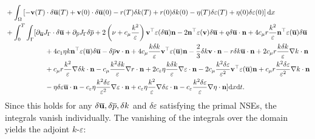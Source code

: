 \documentclass[oneside,11pt]{book}
\numberwithin{equation}{section}
\begin{document}
\begin{align*}
    &+ \int_\Omega \left[-{\bf v}(T)\cdot\delta\overline{\bf u}(T) + {\bf v}(0)\cdot\delta\overline{\bf u}(0) - r(T)\delta k(T) + r(0)\delta k(0) - \eta(T)\delta\varepsilon(T) + \eta(0)\delta\varepsilon(0)\right]{\rm d}x\\
    &+ \int_0^T\int_\Gamma [\partial_{\overline{\bf u}}J_\Gamma\cdot\delta\overline{\bf u} + \partial_{\overline{p}}J_\Gamma\delta\overline{p} + 2\left(\nu + c_\mu\frac{k^2}{\varepsilon}\right){\bf v}^\top\varepsilon(\delta\overline{\bf u}){\bf n} - 2{\bf n}^\top\varepsilon({\bf v})\delta\overline{\bf u} + q\delta\overline{\bf u}\cdot{\bf n} + 4c_\mu r\frac{k^2}{\varepsilon}{\bf n}^\top\varepsilon(\overline{\bf u})\delta\overline{\bf u}\\
    &\hspace{2cm} + 4c_1\eta k{\bf n}^\top\varepsilon(\overline{\bf u})\delta\overline{\bf u} - \delta\overline{p}{\bf v}\cdot{\bf n} + 4c_\mu\frac{k\delta k}{\varepsilon}{\bf v}^\top\varepsilon(\overline{\bf u}){\bf n} - \frac{2}{3}\delta k{\bf v}\cdot{\bf n} - r\delta k\overline{\bf u}\cdot{\bf n} + 2c_\mu r\frac{k\delta k}{\varepsilon}\nabla k\cdot{\bf n}\\
    &\hspace{2cm} + c_\mu r\frac{k^2}{\varepsilon}\nabla\delta k\cdot{\bf n} - c_\mu\frac{k^2\delta k}{\varepsilon}\nabla r\cdot{\bf n} + 2c_\varepsilon\eta\frac{k\delta k}{\varepsilon}\nabla\varepsilon\cdot{\bf n} - 2c_\mu\frac{k^2\delta\varepsilon}{\varepsilon^2}{\bf v}^\top\varepsilon(\overline{\bf u}){\bf n} + c_\mu r\frac{k^2\delta\varepsilon}{\varepsilon^2}\nabla k\cdot{\bf n}\\
    &\hspace{2cm} - \eta\delta\varepsilon\overline{\bf u}\cdot{\bf n} - c_\varepsilon\eta\frac{k^2\delta \varepsilon}{\varepsilon^2}\nabla\varepsilon\cdot{\bf n} + c_\varepsilon\eta\frac{k^2}{\varepsilon}\nabla\delta\varepsilon\cdot{\bf n} - c_\varepsilon\frac{k^2\delta\varepsilon}{\varepsilon}\nabla\eta\cdot{\bf n}]{\rm d}x{\rm d}t.
\end{align*}
Since this holds for any $\delta\overline{\bf u},\delta\overline{p},\delta k$ and $\delta\varepsilon$ satisfying the primal NSEs, the integrals vanish individually. The vanishing of the integrals over the domain yields the adjoint $k$-$\varepsilon$:
\end{document}
